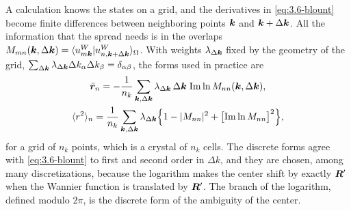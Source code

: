 A calculation knows the states on a grid, and the derivatives in \cref{eq:3.6-blount} become finite differences between neighboring points $\bm{k}$ and $\bm{k} + \Delta\bm{k}$. All the information that the spread needs is in the overlaps $M_{mn}(\bm{k},\Delta\bm{k}) = \langle u^W_{m\bm{k}}|u^W_{n,\bm{k}+\Delta\bm{k}}\rangle_\Omega$. With weights $\lambda_{\Delta\bm{k}}$ fixed by the geometry of the grid, $\sum_{\Delta\bm{k}}\lambda_{\Delta\bm{k}}\Delta k_\alpha\Delta k_\beta = \delta_{\alpha\beta}$, the forms used in practice are~\cite[Eqs.~(31) and (32)]{marzari1997maximally}
\begin{equation}
  \begin{gathered}
  \bar{\bm{r}}_n = -\frac{1}{n_k}\sum_{\bm{k},\Delta\bm{k}}\lambda_{\Delta\bm{k}}\,\Delta\bm{k}\;\mathrm{Im}\ln M_{nn}(\bm{k},\Delta\bm{k}), \\
  \langle r^2\rangle_n = \frac{1}{n_k}\sum_{\bm{k},\Delta\bm{k}}\lambda_{\Delta\bm{k}}\Bigl\{1 - |M_{nn}|^2 + \bigl[\mathrm{Im}\ln M_{nn}\bigr]^2\Bigr\} ,
  \end{gathered}
  \label{eq:3.6-discrete}
\end{equation}
for a grid of $n_k$ points, which is a crystal of $n_k$ cells. The discrete forms agree with \cref{eq:3.6-blount} to first and second order in $\Delta k$, and they are chosen, among many discretizations, because the logarithm makes the center shift by exactly $\bm{R}'$ when the Wannier function is translated by $\bm{R}'$. The branch of the logarithm, defined modulo $2\pi$, is the discrete form of the ambiguity of the center.

